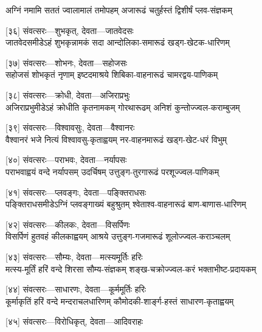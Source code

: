 \twolineshloka
{अग्निं नमामि सततं ज्वालामालं तमोपहम्}
{अजारूढं चतुर्हस्तं द्विशीर्षं प्लव-संज्ञकम्} %

[३६] संवत्सरः—शुभकृत्, देवता—जातवेदसः\\

\twolineshloka
{जातवेदसमीडेऽहं शुभकृन्नामकं सदा}
{आन्दोलिका-समारूढं खड्ग-खेटक-धारिणम्} %

[३७] संवत्सरः—शोभनः, देवता—सहोजसः\\

\twolineshloka
{सहोजसं शोभकृतं नृणाम् इष्टदमाश्रये}
{शिबिका-वाहनारूढं चामरद्वय-पाणिकम्} %

[३८] संवत्सरः—क्रोधी, देवता—अजिराप्रभुः\\

\twolineshloka
{अजिराप्रभुमीडेऽहं क्रोधीति कृतनामकम्}
{गोरथारूढम् अनिशं कुन्तोज्ज्वल-कराम्बुजम्} %

[३९] संवत्सरः—विश्वावसुः, देवता—वैश्वानरः\\

\twolineshloka
{वैश्वानरं भजे नित्यं विश्वावसु-कृताह्वयम्}
{नर-वाहनमारूढं खड्ग-खेट-धरं विभुम्} %

[४०] संवत्सरः—पराभवः, देवता—नर्यापसः\\

\twolineshloka
{पराभवाह्वयं वन्दे नर्यापसम् उदर्चिषम्}
{उत्तुङ्ग-तुरगारूढं परशूज्ज्वल-पाणिकम्} %

[४१] संवत्सरः—प्लवङ्गः, देवता—पङ्क्तिराधसः\\

\twolineshloka
{पङ्क्तिराधसमीडेऽग्निं प्लवङ्गाख्यं बहुश्रुतम्}
{श्वेताश्व-वाहनारूढं बाण-बाणास-धारिणम्} %

[४२] संवत्सरः—कीलकः, देवता—विसर्पिणः\\

\twolineshloka
{विसर्पिणं हुतवहं कीलकाह्वयम् आश्रये}
{उत्तुङ्ग-गजमारूढं शूलोज्ज्वल-कराञ्चलम्} %

[४३] संवत्सरः—सौम्यः, देवता—मत्स्यमूर्तिः हरिः\\

\twolineshloka
{मत्स्य-मूर्तिं हरिं वन्दे शिरसा सौम्य-संज्ञकम्}
{शङ्ख-चक्रोज्ज्वल-करं भक्ताभीष्ट-प्रदायकम्} %

[४४] संवत्सरः—साधारणः, देवता—कूर्ममूर्तिः हरिः\\

\twolineshloka
{कूर्माकृतिं हरिं वन्दे मन्दराचलधारिणम्}
{कौमोदकी-शार्ङ्ग-हस्तं साधारण-कृताह्वयम्} %

[४५] संवत्सरः—विरोधिकृत्, देवता—आदिवराहः\\

